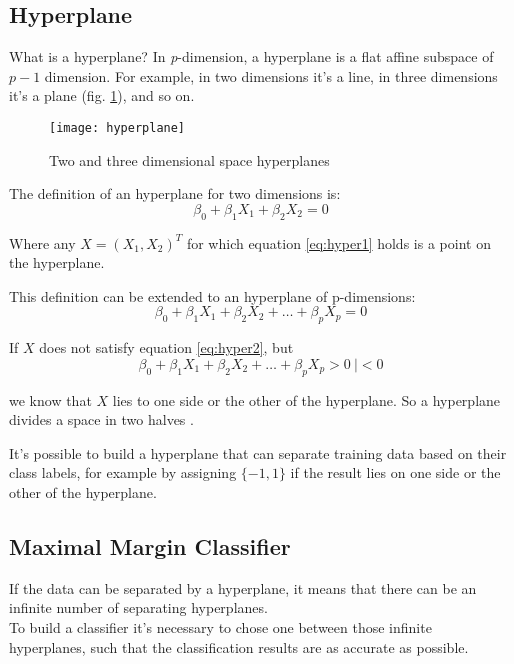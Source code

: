 \subsection{Hyperplane}
What is a hyperplane? In \textit{p}-dimension, a hyperplane is a flat affine subspace of $p - 1$ dimension. For example, in two dimensions it's a line, in three dimensions it's a plane (fig. \ref{fig:hyperplane}), and so on.

\begin{figure}[H]
	\centering
	\texttt{[image: hyperplane]}
	\caption{Two and three dimensional space hyperplanes \cite{hyperplaneimg}}
	\label{fig:hyperplane}
\end{figure}

The definition of an hyperplane for two dimensions is:
\begin{equation} \label{eq:hyper1}
\beta_0 + \beta_1 X_1 + \beta_2 X_2 = 0
\end{equation}

Where any $X = (X_1, X_2)^T$ for which equation \ref{eq:hyper1} holds is a point on the hyperplane.

This definition can be extended to an hyperplane of p-dimensions:
\begin{equation} \label{eq:hyper2}
\beta_0 + \beta_1 X_1 + \beta_2 X_2 + \dots + \beta_p X_p = 0
\end{equation}

If $X$ does not satisfy equation \ref{eq:hyper2}, but
\begin{equation} \label{eq:hyper3}
\beta_0 + \beta_1 X_1 + \beta_2 X_2 + \dots + \beta_p X_p > 0 \ | < 0
\end{equation}

we know that $X$ lies to one side or the other of the hyperplane. So a hyperplane divides a space in two halves \cite{ISLR}.

It's possible to build a hyperplane that can separate training data based on their class labels, for example by assigning $\{-1, 1\}$ if the result lies on one side or the other of the hyperplane.

\subsection{Maximal Margin Classifier}
If the data can be separated by a hyperplane, it means that there can be an infinite number of separating hyperplanes. \\
To build a classifier it's necessary to chose one between those infinite hyperplanes, such that the classification results are as accurate as possible.

